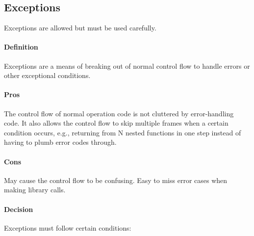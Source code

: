 \documentclass[
]{article}
\begin{document}
\subsection{Exceptions}

Exceptions are allowed but must be used carefully.

\paragraph{Definition}

Exceptions are a means of breaking out of normal control flow to handle
errors or other exceptional conditions.

\paragraph{Pros}

The control flow of normal operation code is not cluttered by
error-handling code. It also allows the control flow to skip multiple
frames when a certain condition occurs, e.g., returning from N nested
functions in one step instead of having to plumb error codes through.

\paragraph{Cons}

May cause the control flow to be confusing. Easy to miss error cases
when making library calls.

\paragraph{Decision}

Exceptions must follow certain conditions:
\end{document}
